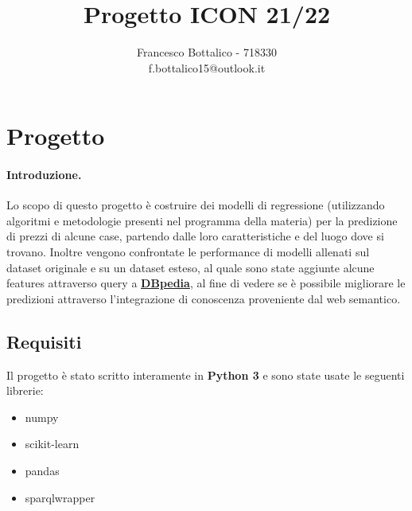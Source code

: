 \documentclass{article}
\title{Progetto ICON 21/22}
\author{Francesco Bottalico - 718330 \\ f.bottalico15@outlook.it}
\date{}
\begin{document}
\maketitle
\tableofcontents

\section{Progetto}
\paragraph{Introduzione.}
Lo scopo di questo progetto è costruire dei modelli di regressione (utilizzando
algoritmi e metodologie presenti nel programma della materia) per la
predizione di prezzi di alcune case, partendo dalle loro caratteristiche e
del luogo dove si trovano. Inoltre vengono confrontate le performance di modelli
allenati sul dataset originale e su un dataset esteso, al quale sono state
aggiunte alcune features attraverso query a \href{http://dbpedia.org}
{\textbf{DBpedia}}, al fine di vedere se è possibile migliorare le predizioni 
attraverso l'integrazione di conoscenza proveniente dal web semantico.

\subsection{Requisiti}
Il progetto è stato scritto interamente in \textbf{Python 3} e sono state usate
le seguenti librerie:
\begin{itemize}
	\itemsep0em
	\item numpy
	\item scikit-learn
	\item pandas
	\item sparqlwrapper
\end{itemize}
\end{document}
